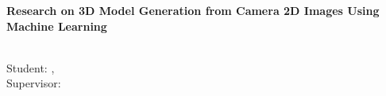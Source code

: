 \clearpage
{}
\thispagestyle{plain}

\vspace*{-6mm}
\begin{center}
\textbf{\large Research on 3D Model Generation from Camera 2D Images Using Machine Learning}\\[1mm]
\end{center}

\begin{flushright}
\departmentname\\
Student: \studentID, \authorShort\\
Supervisor: \supervisorname
\end{flushright}

\vspace{1mm}
\setcounter{table}{0}
\setcounter{figure}{0}
\renewcommand{\thetable}{\arabic{table}}
\renewcommand{\thefigure}{\arabic{figure}}
\setlength{\columnsep}{7mm}
